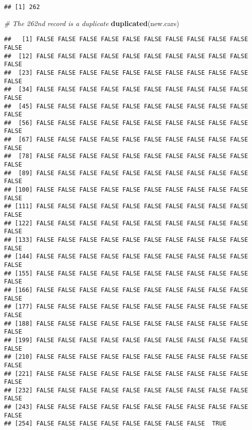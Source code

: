 \documentclass[11pt,]{article}
\newenvironment{Shaded}{\begin{snugshade}}{\end{snugshade}}
\newcommand{\CommentTok}[1]{\textcolor[rgb]{0.56,0.35,0.01}{\textit{#1}}}
\newcommand{\KeywordTok}[1]{\textcolor[rgb]{0.13,0.29,0.53}{\textbf{#1}}}
\newcommand{\NormalTok}[1]{#1}
\begin{document}
\begin{verbatim}
## [1] 262
\end{verbatim}

\begin{Shaded}
\begin{Highlighting}[]
  \CommentTok{# The 262nd record is a duplicate}
  \KeywordTok{duplicated}\NormalTok{(new.cars)}
\end{Highlighting}
\end{Shaded}

\begin{verbatim}
##   [1] FALSE FALSE FALSE FALSE FALSE FALSE FALSE FALSE FALSE FALSE FALSE
##  [12] FALSE FALSE FALSE FALSE FALSE FALSE FALSE FALSE FALSE FALSE FALSE
##  [23] FALSE FALSE FALSE FALSE FALSE FALSE FALSE FALSE FALSE FALSE FALSE
##  [34] FALSE FALSE FALSE FALSE FALSE FALSE FALSE FALSE FALSE FALSE FALSE
##  [45] FALSE FALSE FALSE FALSE FALSE FALSE FALSE FALSE FALSE FALSE FALSE
##  [56] FALSE FALSE FALSE FALSE FALSE FALSE FALSE FALSE FALSE FALSE FALSE
##  [67] FALSE FALSE FALSE FALSE FALSE FALSE FALSE FALSE FALSE FALSE FALSE
##  [78] FALSE FALSE FALSE FALSE FALSE FALSE FALSE FALSE FALSE FALSE FALSE
##  [89] FALSE FALSE FALSE FALSE FALSE FALSE FALSE FALSE FALSE FALSE FALSE
## [100] FALSE FALSE FALSE FALSE FALSE FALSE FALSE FALSE FALSE FALSE FALSE
## [111] FALSE FALSE FALSE FALSE FALSE FALSE FALSE FALSE FALSE FALSE FALSE
## [122] FALSE FALSE FALSE FALSE FALSE FALSE FALSE FALSE FALSE FALSE FALSE
## [133] FALSE FALSE FALSE FALSE FALSE FALSE FALSE FALSE FALSE FALSE FALSE
## [144] FALSE FALSE FALSE FALSE FALSE FALSE FALSE FALSE FALSE FALSE FALSE
## [155] FALSE FALSE FALSE FALSE FALSE FALSE FALSE FALSE FALSE FALSE FALSE
## [166] FALSE FALSE FALSE FALSE FALSE FALSE FALSE FALSE FALSE FALSE FALSE
## [177] FALSE FALSE FALSE FALSE FALSE FALSE FALSE FALSE FALSE FALSE FALSE
## [188] FALSE FALSE FALSE FALSE FALSE FALSE FALSE FALSE FALSE FALSE FALSE
## [199] FALSE FALSE FALSE FALSE FALSE FALSE FALSE FALSE FALSE FALSE FALSE
## [210] FALSE FALSE FALSE FALSE FALSE FALSE FALSE FALSE FALSE FALSE FALSE
## [221] FALSE FALSE FALSE FALSE FALSE FALSE FALSE FALSE FALSE FALSE FALSE
## [232] FALSE FALSE FALSE FALSE FALSE FALSE FALSE FALSE FALSE FALSE FALSE
## [243] FALSE FALSE FALSE FALSE FALSE FALSE FALSE FALSE FALSE FALSE FALSE
## [254] FALSE FALSE FALSE FALSE FALSE FALSE FALSE FALSE  TRUE
\end{verbatim}
\end{document}
